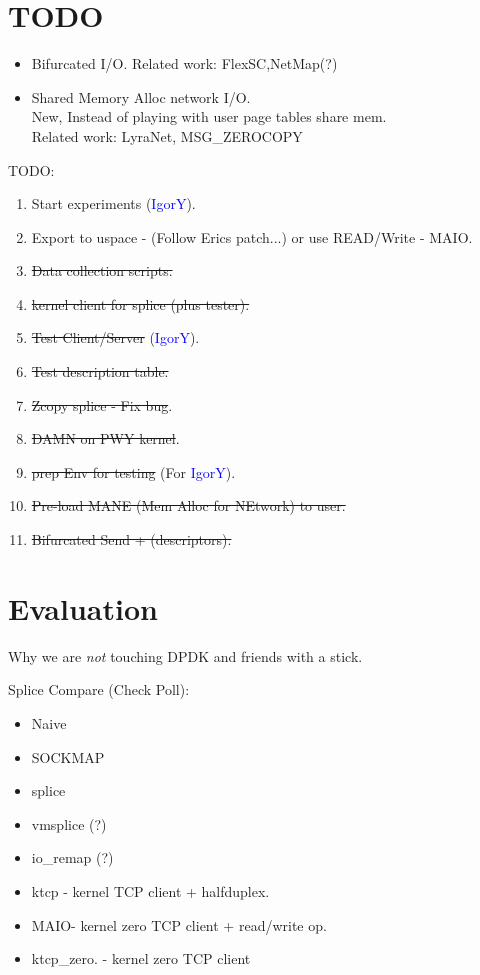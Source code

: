 \documentclass[sigconf,9pt]{acmart}
\newcommand{\oursys}{MAIO\xspace}
\newcommand{\igor}{\textcolor{blue}{IgorY}\xspace}
\begin{document}
\maketitle
\sloppypar

\section{TODO}
\begin{itemize}
    \item Bifurcated I/O. Related work: FlexSC,NetMap(?)
    \item Shared Memory Alloc network I/O.\\ New, Instead of playing with user page tables share mem.\\ Related work: LyraNet, MSG\_ZEROCOPY\cite{desendmsg}
\end{itemize}
\smallskip
TODO:
\begin{enumerate}
    \item Start experiments (\igor).
    \item Export to uspace - (Follow Erics patch...) or use READ/Write - \oursys.
    \item \st{Data collection scripts.}
    \item \st{kernel client for splice (plus tester).}
    \item \st{Test Client/Server }(\igor).
    \item \st{Test description table.}
    \item \st{Zcopy splice - Fix bug}.
    \item \st{DAMN on PWY kernel}.
    \item \st{prep Env for testing }(For \igor).
    \item \st{Pre-load MANE (Mem Alloc for NEtwork) to user.} 
    \item \st{Bifurcated Send + (descriptors).}
\end{enumerate}




\section{Evaluation}
Why we are \emph{not} touching DPDK and friends with a stick.

Splice Compare (Check Poll):
\begin{itemize}
    \item Naive
    \item SOCKMAP
    \item splice
    \item vmsplice  (?)
    \item io\_remap (?)
    \item ktcp - kernel TCP client + halfduplex.
    \item \oursys - kernel zero TCP client + read/write op. 
    \item ktcp\_zero. - kernel zero TCP client
\end{itemize}
\end{document}
